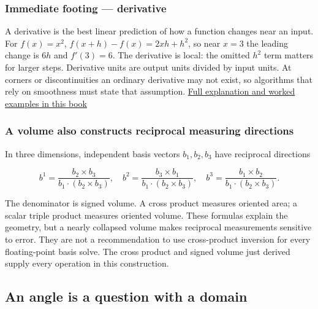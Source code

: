 \subsubsection{Immediate footing --- derivative}\label{01-foundations-i-ch017-immediate-footing-derivative}

\hypertarget{01-foundations-i-ch017-immediate-footing-derivative}{}

A derivative is the best linear prediction of how a function changes near an input. For \(f(x)=x^2\), \(f(x+h)-f(x)=2xh+h^2\), so near \(x=3\) the leading change is \(6h\) and \(f'(3)=6\). The derivative is local: the omitted \(h^2\) term matters for larger steps. Derivative units are output units divided by input units. At corners or discontinuities an ordinary derivative may not exist, so algorithms that rely on smoothness must state that assumption. \hyperref[01-foundations-i-ch020-functions-limits-continuity-and-scalar-change]{Full explanation and worked examples in this book}

\subsubsection{A volume also constructs reciprocal measuring directions}\label{01-foundations-i-ch017-a-volume-also-constructs-reciprocal-measuring-directions}

\hypertarget{01-foundations-i-ch017-a-volume-also-constructs-reciprocal-measuring-directions}{}

In three dimensions, independent basis vectors \(b_1,b_2,b_3\) have reciprocal directions

\[
b^1=\frac{b_2\times b_3}{b_1\cdot(b_2\times b_3)},\quad
b^2=\frac{b_3\times b_1}{b_1\cdot(b_2\times b_3)},\quad
b^3=\frac{b_1\times b_2}{b_1\cdot(b_2\times b_3)}.
\]

The denominator is signed volume. A cross product measures oriented area; a scalar triple product measures oriented volume. These formulas explain the geometry, but a nearly collapsed volume makes reciprocal measurements sensitive to error. They are not a recommendation to use cross-product inversion for every floating-point basis solve. The cross product and signed volume just derived supply every operation in this construction.

\subsection{An angle is a question with a domain}\label{01-foundations-i-ch017-an-angle-is-a-question-with-a-domain}

